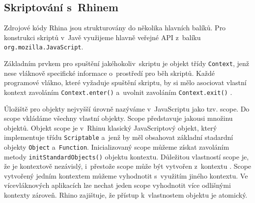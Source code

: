 
\subsection{Skriptování s~Rhinem}
\label{Chapter.JavaScriptInJavaAnalysis.Rhino.ScriptingWithRhino}

Zdrojové kódy Rhina jsou strukturovány do několika hlavních balíků. Pro konstrukci skriptů v~Javě využijeme hlavně veřejné API z~balíku \texttt{org.mozilla.JavaScript}.

Základním prvkem pro spuštění jakéhokoliv~skriptu je objekt třídy \texttt{Context}, jenž nese vláknově specifické informace o~prostředí pro běh skriptů. Každé programové vlákno, které vyžaduje spuštění skriptu, by si mělo asociovat vlastní kontext zavoláním \texttt{Context.enter()} a~uvolnit zavoláním \texttt{Context.exit()} \cite{Bibliography.Rhino.ScopesAndContexts}.

Úložiště pro objekty nejvyšší úrovně nazýváme v~JavaScriptu jako tzv. scope. Do scope vkládáme všechny vlastní objekty. Scope představuje jakousi množinu objektů. Objekt scope  je v~Rhinu klasický JavaScriptový objekt, který implementuje třídu \texttt{Scriptable} a~jenž by měl obsahovat základní stadardní objekty \texttt{Object} a~\texttt{Function}. Inicializovaný scope můžeme získat zavoláním metody \texttt{initStandardObjects()} objektu kontextu. Důležitou vlastností scope  je, že je kontextově nezávislý, i~přestože scope může být vytvořen z~kontextu \cite{Bibliography.Rhino.ScopesAndContexts}. Scope vytvořený jedním kontextem můžeme vyhodnotit s~využitím jiného kontextu. Ve vícevláknových aplikacích lze nechat jeden scope vyhodnotit více odlišnými kontexty zároveň. Rhino zajištuje, že přístup k~vlastnostem objektu je atomický.

